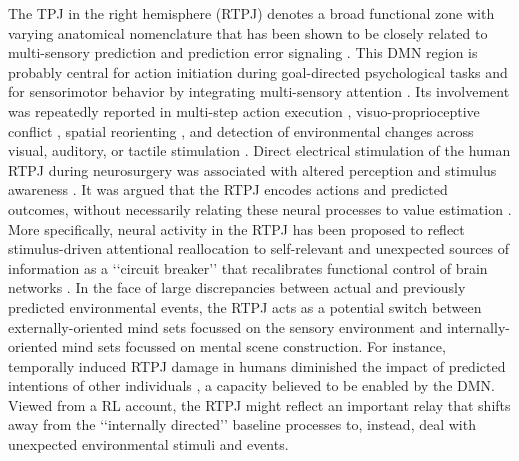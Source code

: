 \documentclass[10pt,letterpaper]{article}
\begin{document}
The TPJ in the right hemisphere (RTPJ) denotes a broad functional zone with
varying anatomical nomenclature \citep{marstpj2011, seghier2010, seghier2013angular}
that has been shown to be closely related to
multi-sensory prediction and prediction error signaling
\citep{downar2000multimodal, vetter2011, shulman2010, shulman2007}.
This DMN region is probably central for
action initiation during goal-directed psychological tasks and for
sensorimotor behavior by integrating multi-sensory attention
\citep{corbetta2002control}.
Its involvement was repeatedly reported in
multi-step action execution \citep{hartmann2005takes},
visuo-proprioceptive conflict \citep{Balslev2005},
spatial reorienting \citep{corbetta2000},
and
detection of environmental changes across
visual, auditory, or tactile stimulation
\citep{downar2000multimodal}.
Direct electrical stimulation of the human
RTPJ during neurosurgery was associated with altered perception
and stimulus awareness \citep{blanke2002neuropsychology}.
%
It was argued that the RTPJ encodes actions and predicted outcomes,
without necessarily relating these neural processes to value estimation
\citep{liljeholm2013neural, hamilton2008action,
jakobs2009effects}.
More specifically, neural activity in the RTPJ has been proposed to reflect
stimulus-driven attentional reallocation to
self-relevant and unexpected sources of information
as a ‘‘circuit breaker’’ that recalibrates functional control of brain networks
\citep{bzdok2013tpj, corbettashul2008}.
In the face of large discrepancies between actual and previously predicted
environmental events, the RTPJ acts as a potential switch between
externally-oriented mind sets focussed on the
sensory environment and internally-oriented mind sets focussed
on mental scene construction.
For instance, temporally induced RTPJ damage in humans diminished the
impact of predicted intentions of other individuals
\citep{young2010disruption},
a capacity believed to be enabled by the DMN.
Viewed from a RL account,
the RTPJ might reflect an important relay that shifts away
from the ‘‘internally directed’’ baseline processes
to, instead, deal with unexpected environmental stimuli and events.
\end{document}

